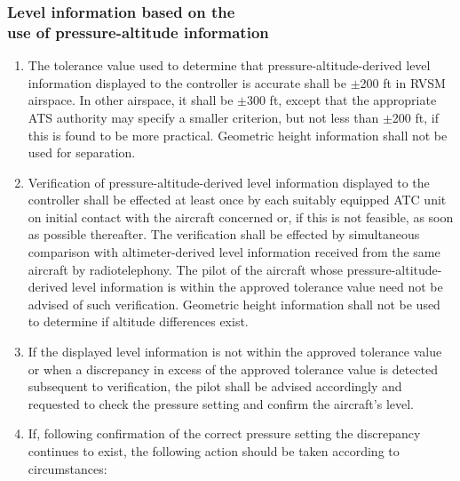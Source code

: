 \subsubsection[Level information based on the use of pressure-altitude information]{Level information based on the \\ use of pressure-altitude information}

\begin{enumeratesc}
    \begin{enumerate}
        \item The tolerance value used to determine that pressure-altitude-derived level information displayed to the controller is accurate shall be $\pm$200 ft in RVSM airspace. In other airspace, it shall be $\pm$300 ft, except that the appropriate ATS authority may specify a smaller criterion, but not less than $\pm$200 ft, if this is found to be more practical. Geometric height information shall not be used for separation.
        \item Verification of pressure-altitude-derived level information displayed to the controller shall be effected at least once by each suitably equipped ATC unit on initial contact with the aircraft concerned or, if this is not feasible, as soon as possible thereafter. The verification shall be effected by simultaneous comparison with altimeter-derived level information received from the same aircraft by radiotelephony. The pilot of the aircraft whose pressure-altitude-derived level information is within the approved tolerance value need not be advised of such verification. Geometric height information shall not be used to determine if altitude differences exist.
        \item If the displayed level information is not within the approved tolerance value or when a discrepancy in excess of the approved tolerance value is detected subsequent to verification, the pilot shall be advised accordingly and requested to check the pressure setting and confirm the aircraft's level.
        \item If, following confirmation of the correct pressure setting the discrepancy continues to exist, the following action should be taken according to circumstances:

    \end{enumerate}


\end{enumeratesc}
